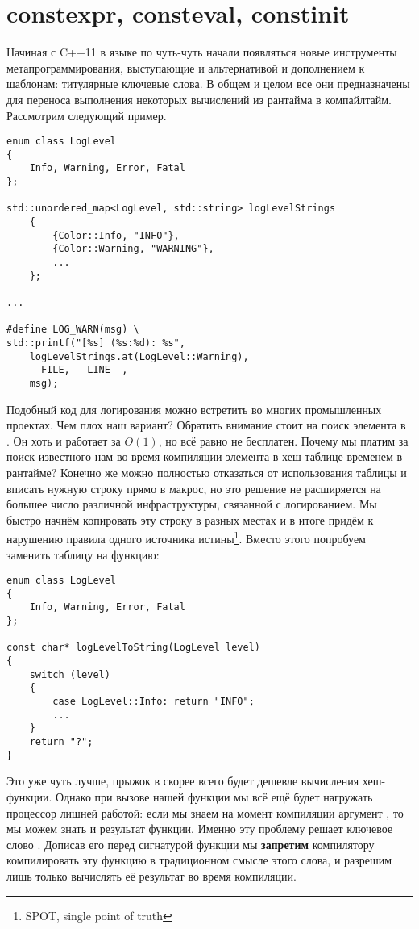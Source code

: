 \section{constexpr, consteval, constinit}
Начиная с C++11 в языке по чуть-чуть начали появляться новые инструменты метапрограммирования, выступающие и альтернативой и дополнением к шаблонам: титулярные ключевые слова. В общем и целом все они предназначены для переноса выполнения некоторых вычислений из рантайма в компайлтайм. Рассмотрим следующий пример.
\begin{verbatim}
enum class LogLevel
{
    Info, Warning, Error, Fatal
};

std::unordered_map<LogLevel, std::string> logLevelStrings
    {
        {Color::Info, "INFO"},
        {Color::Warning, "WARNING"},
        ...
    };

...

#define LOG_WARN(msg) \
std::printf("[%s] (%s:%d): %s",
    logLevelStrings.at(LogLevel::Warning),
    __FILE, __LINE__,
    msg);
\end{verbatim}
Подобный код для логирования можно встретить во многих промышленных проектах. Чем плох наш вариант? Обратить внимание стоит на поиск элемента в . Он хоть и работает за $O(1)$, но всё равно не бесплатен. Почему мы платим за поиск известного нам во время компиляции элемента в хеш-таблице временем в рантайме? Конечно же можно полностью отказаться от использования таблицы и вписать нужную строку прямо в макрос, но это решение не расширяется на большее число различной инфраструктуры, связанной с логированием. Мы быстро начнём копировать эту строку в разных местах и в итоге придём к нарушению правила одного источника истины\footnote{SPOT, single point of truth}. Вместо этого попробуем заменить таблицу на функцию:
\begin{verbatim}
enum class LogLevel
{
    Info, Warning, Error, Fatal
};

const char* logLevelToString(LogLevel level)
{
    switch (level)
    {
        case LogLevel::Info: return "INFO";
        ...
    }
    return "?";
}
\end{verbatim}
Это уже чуть лучше, прыжок в  скорее всего будет дешевле вычисления хеш-функции. Однако при вызове нашей функции мы всё ещё будет нагружать процессор лишней работой: если мы знаем на момент компиляции аргумент , то мы можем знать и результат функции. Именно эту проблему решает ключевое слово . Дописав его перед сигнатурой функции мы \textbf{запретим} компилятору компилировать эту функцию в традиционном смысле этого слова, и разрешим лишь только вычислять её результат во время компиляции.
